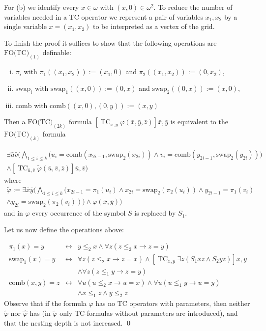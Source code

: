 \documentclass{LMCS}
\renewcommand{\phi}{\varphi}
\DeclareMathOperator{\TC}{TC}
\begin{document}
For (b) we identify every $x \in \omega$ with $(x,0) \in \omega^2$.
To reduce the number of variables needed in a TC operator 
we represent a pair of variables $x_1,x_2$ by a single variable 
$x=(x_1,x_2)$ to be interpreted as a vertex of the grid. 

To finish the proof it suffices to show that the following operations are
 $\textrm{FO(TC)}_{(1)}$ definable:
\begin{enumerate}[(i)]
\item $\pi_i$ with $\pi_1((x_1,x_2)):=(x_1,0)$ and $\pi_2((x_1,x_2)):=(0,x_2)$,
\item $\textrm{swap}_i$ with $\textrm{swap}_1((x,0)):=(0,x)$ and $\textrm{swap}_2((0,x)):=(x,0)$,
\item $\textrm{comb}$ with $\textrm{comb}((x,0),(0,y)):=(x,y)$
\end{enumerate}

Then a $\textrm{FO(TC)}_{(2k)}$ formula  
$[\TC_{\bar x, \bar y} \phi(\bar x,\bar y, \bar z)]\bar x, \bar y$
is equivalent to the $\textrm{FO(TC)}_{(k)}$ formula

\begin{multline*}
    \exists \bar u \bar v  \Big( \bigwedge_{1 \le i \le k}  \big(  u_i= \textrm{comb}(x_{2i-1},\textrm{swap}_2(x_{2i})) 
                         \wedge   v_i= \textrm{comb}(y_{2i-1},\textrm{swap}_2(y_{2i}))\big) \\
   \wedge   [\TC_{\bar u, \bar v} \tilde \phi(\bar u,\bar v, \bar z)]\bar u, \bar v \Big)
\end{multline*}
where
\begin{multline*}
  \tilde \phi := \exists \bar x \bar y  \Big( \bigwedge_{1 \le i \le k}  \big( x_{2i-1}= \pi_1(u_i) \wedge 
  x_{2i}=\textrm{swap}_2(\pi_2(u_i))  \wedge  y_{2i-1}= \pi_1(v_i) \\ 
  \wedge y_{2i}=\textrm{swap}_2(\pi_2(v_i)) \big) \wedge   \phi(\bar x, \bar y) \Big)
\end{multline*}
and in $\phi$ every occurrence of the symbol $S$ is replaced by $S_1$.

Let us now define the operations above:

\begin{eqnarray*}
\pi_1(x)=y & \leftrightarrow & y \le_2 x \wedge \forall z (z \le_2 x \rightarrow z=y) \\
\textrm{swap}_1(x)=y &\leftrightarrow &  \forall z (z \le_2 x \rightarrow z=x) \wedge  
  [\TC_{x,y} \exists z (S_1xz \wedge S_2yz)]x,y \\
 && \wedge \forall z (z \le_1 y \rightarrow z=y) \\
 \textrm{comb}(x,y)=z & \leftrightarrow & \forall u (u \le_2 x \rightarrow u=x) 
   \wedge \forall u (u \le_1 y \rightarrow u=y) \\
 && \wedge x \le_1 z \wedge y \le_2 z
\end{eqnarray*}
Observe that if the formula $\phi$ has no TC operators with parameters, then neither
$\tilde \phi$ nor $\hat \phi$ has (in $\tilde\phi$ only TC-formulas without parameters are introduced),
and that the nesting depth is not increased.
\qed
\end{document}
